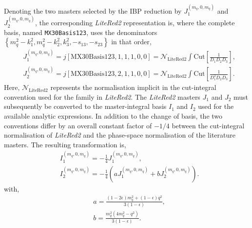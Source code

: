 Denoting the two masters selected by the IBP reduction by $J_1^{(m_q,0,m_q)}$ and
$J_2^{(m_q,0,m_q)}$, the corresponding \textit{LiteRed2} representation is, where the complete
basis, named \texttt{MX30Basis123}, uses the denominators
$\left\{m_q^2-k_1^2, m_q^2-k_2^2, k_3^2,-s_{13},-s_{23}\right\}$ in that order,
\begin{equation}
    \begin{split}
        &J_1^{(m_q,0,m_q)} = j[\text{MX30Basis123},1,1,1,0,0] = \mathcal N_\text{LiteRed2}\int\text{Cut}\!\left[\frac1{D_1D_2D_3}\right],\\
        &J_2^{(m_q,0,m_q)} = j[\text{MX30Basis123},2,1,1,0,0] = \mathcal N_\text{LiteRed2}\int\text{Cut}\!\left[\frac1{D_1^2D_2D_3}\right].
    \end{split}
\end{equation}
Here, $\mathcal N_\text{LiteRed2}$ represents the normalisation implicit in the cut-integral
convention used for the family in \textit{LiteRed2}. The \textit{LiteRed2} masters $J_1$ and
$J_2$ must subsequently be converted to the master-integral basis $I_1$ and $I_2$ used for the
available analytic expressions. In addition to the change of basis, the two conventions differ
by an overall constant factor of $-1/4$ between the cut-integral normalisation of
\textit{LiteRed2} and the phase-space normalisation of the literature masters.
The resulting transformation is,
\begin{equation}
    \begin{split}
        &I_1^{(m_q,0,m_q)} = -\frac14J_1^{(m_q,0,m_q)},\\
        &I_2^{(m_q,0,m_q)} = -\frac14\!\left(aJ_1^{(m_q,0,m_q)}+bJ_2^{(m_q,0,m_q)}\right).
    \end{split}
\end{equation}
with,
\begin{equation}
    \begin{split}
        &a=\frac{(1-2\epsilon)m_q^2+(1-\epsilon)q^2}{3(1-\epsilon)},\\
        &b=\frac{m_q^2\!\left(4m_q^2-q^2\right)}{3(1-\epsilon)}.
    \end{split}
\end{equation}


